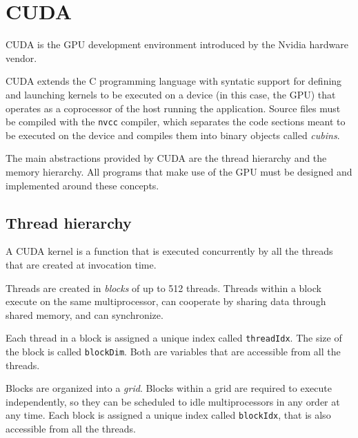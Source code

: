 %
%
%


\section{CUDA}

CUDA is the GPU development environment
introduced by the Nvidia hardware vendor.

CUDA extends the C programming language
with syntatic support for defining and launching kernels
to be executed on a device (in this case, the GPU)
that operates as a coprocessor of the host running the application.
Source files must be compiled with the \texttt{nvcc} compiler,
which separates the code sections meant to be executed on the device
and compiles them into binary objects called \emph{cubins}.

The main abstractions provided by CUDA
are the thread hierarchy and the memory hierarchy.
All programs that make use of the GPU
must be designed and implemented around these concepts.

\subsection{Thread hierarchy}
\label{sub:thread-hierarchy}

A CUDA kernel is a function
that is executed concurrently
by all the threads that are created
at invocation time.

Threads are created in \emph{blocks}
of up to 512 threads.
Threads within a block
execute on the same multiprocessor,
can cooperate by sharing data through shared memory,
and can synchronize.

Each thread in a block
is assigned a unique index
called \verb+threadIdx+.
The size of the block
is called \verb+blockDim+.
Both are variables that are accessible
from all the threads.

Blocks are organized into a \emph{grid}.
Blocks within a grid
are required to execute independently,
so they can be scheduled to idle multiprocessors
in any order at any time.
Each block is assigned a unique index
called \verb+blockIdx+,
that is also accessible from all the threads.

